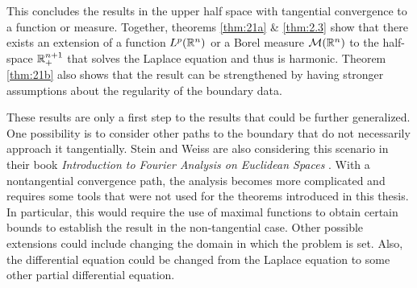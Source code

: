 This concludes the results in the upper half space with tangential convergence to a function or measure. Together, theorems \ref{thm:21a} \& \ref{thm:2.3} show that there exists an extension of a function $L^p(\mathbb R^n)$ or a Borel measure $\mathcal M(\mathbb R^n)$ to the half-space $\mathbb R^{n+1}_+$ that solves the Laplace equation and thus is harmonic. Theorem \ref{thm:21b} also shows that the result can be strengthened by having stronger assumptions about the regularity of the boundary data.

These results are only a first step to the results that could be further generalized. One possibility is to consider other paths to the boundary that do not necessarily approach it tangentially. Stein and Weiss are also considering this scenario in their book \textit{Introduction to Fourier Analysis on Euclidean Spaces} \cite{stein_weiss}. With a nontangential convergence path, the analysis becomes more complicated and requires some tools that were not used for the theorems introduced in this thesis. In particular, this would require the use of maximal functions to obtain certain bounds to establish the result in the non-tangential case. Other possible extensions could include changing the domain in which the problem is set. Also, the differential equation could be changed from the Laplace equation to some other partial differential equation.